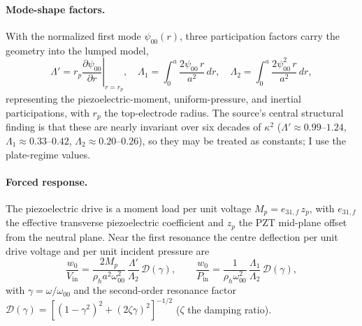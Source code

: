\documentclass{article}
\begin{document}
\paragraph{Mode-shape factors.} With the normalized first mode $\psi_{00}(r)$, three
participation factors carry the geometry into the lumped model,
\begin{equation}
\Lambda' = r_p\!\left.\frac{\partial \psi_{00}}{\partial r}\right|_{r=r_p},\quad
\Lambda_1 = \int_0^a \frac{2\psi_{00}\,r}{a^2}\,dr,\quad
\Lambda_2 = \int_0^a \frac{2\psi_{00}^2\,r}{a^2}\,dr,
\label{eq:shape}
\end{equation}
representing the piezoelectric-moment, uniform-pressure, and inertial participations, with $r_p$
the top-electrode radius. The source's central structural finding is that these are nearly
invariant over six decades of $\kappa^2$ ($\Lambda'\!\approx\!0.99\text{--}1.24$,
$\Lambda_1\!\approx\!0.33\text{--}0.42$, $\Lambda_2\!\approx\!0.20\text{--}0.26$), so they may be
treated as constants; I use the plate-regime values.

\paragraph{Forced response.} The piezoelectric drive is a moment load per unit voltage
$M_p = e_{31,f}\,z_p$, with $e_{31,f}$ the effective transverse piezoelectric coefficient and
$z_p$ the PZT mid-plane offset from the neutral plane. Near the first resonance the centre
deflection per unit drive voltage and per unit incident pressure are
\begin{equation}
\frac{w_0}{V_{\mathrm{in}}} = \frac{2 M_p}{\rho_h a^2 \omega_{00}^2}\,\frac{\Lambda'}{\Lambda_2}\,\mathcal{D}(\gamma),
\qquad
\frac{w_0}{P_{\mathrm{in}}} = \frac{1}{\rho_h \omega_{00}^2}\,\frac{\Lambda_1}{\Lambda_2}\,\mathcal{D}(\gamma),
\label{eq:defl}
\end{equation}
with $\gamma=\omega/\omega_{00}$ and the second-order resonance factor
$\mathcal{D}(\gamma)=[(1-\gamma^2)^2+(2\zeta\gamma)^2]^{-1/2}$ ($\zeta$ the damping ratio).
\end{document}

